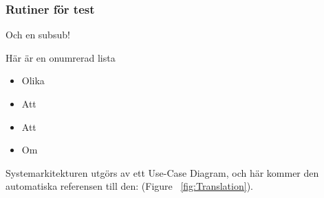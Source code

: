 \documentclass[11pt]{article} %
\begin{document}
\subsubsection{Rutiner för test}
Och en subsub!

Här är en onumrerad lista
\begin{itemize}
\item Olika
\item Att 
\item Att
\item Om 
\end{itemize}



Systemarkitekturen utgörs av ett Use-Case Diagram, och här kommer den automatiska referensen till den:   (Figure ~\ref{fig:Translation}).



\pagebreak
\end{document}
